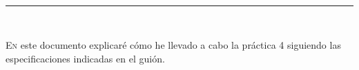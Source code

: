 
\begin{center}
	{\fboxrule=4pt } \\
	\rule{15cm}{0pt} \\
\end{center}

 
\lettrine[lines=3, depth = 0]{E}{n} este documento explicar\'e c\'omo he llevado a cabo la práctica 4 siguiendo las especificaciones indicadas en el gui\'on.


\newpage
{}